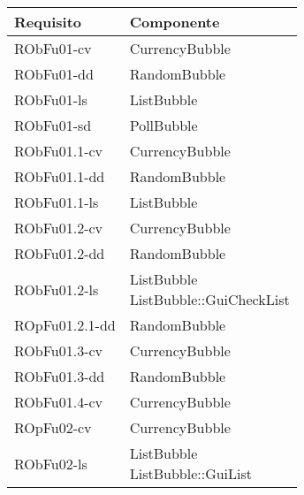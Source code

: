 \begin{center}
\begin{longtable}{|
*{1}{>{\centering\arraybackslash}m{2.5cm}|}
*{1}{>{\centering\arraybackslash}m{7.5cm}|}}
\hline \textbf{Requisito} & \textbf{Componente}\\
\hline \endhead
\hline \endfoot

RObFu01-cv & \makecell[l]{CurrencyBubble
\\}\\\hline
RObFu01-dd & \makecell[l]{RandomBubble
\\}\\\hline
RObFu01-ls & \makecell[l]{ListBubble
\\}\\\hline
RObFu01-sd & \makecell[l]{PollBubble
\\}\\\hline
RObFu01.1-cv & \makecell[l]{CurrencyBubble
\\}\\\hline
RObFu01.1-dd & \makecell[l]{RandomBubble
\\}\\\hline
RObFu01.1-ls & \makecell[l]{ListBubble
\\}\\\hline
RObFu01.2-cv & \makecell[l]{CurrencyBubble
\\}\\\hline
RObFu01.2-dd & \makecell[l]{RandomBubble
\\}\\\hline
RObFu01.2-ls & \makecell[l]{ListBubble
\\ListBubble::GuiCheckList
\\}\\\hline
ROpFu01.2.1-dd & \makecell[l]{RandomBubble
\\}\\\hline
RObFu01.3-cv & \makecell[l]{CurrencyBubble
\\}\\\hline
RObFu01.3-dd & \makecell[l]{RandomBubble
\\}\\\hline
RObFu01.4-cv & \makecell[l]{CurrencyBubble
\\}\\\hline
ROpFu02-cv & \makecell[l]{CurrencyBubble
\\}\\\hline
RObFu02-ls & \makecell[l]{ListBubble
\\ListBubble::GuiList
\\}\\\hline

\end{longtable}
\end{center}
